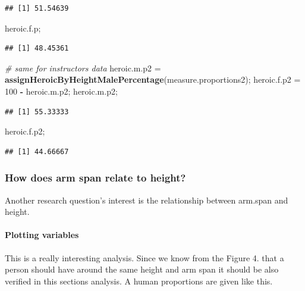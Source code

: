 \documentclass[]{article}
\newenvironment{Shaded}{\begin{snugshade}}{\end{snugshade}}
\newcommand{\CommentTok}[1]{\textcolor[rgb]{0.56,0.35,0.01}{\textit{#1}}}
\newcommand{\DecValTok}[1]{\textcolor[rgb]{0.00,0.00,0.81}{#1}}
\newcommand{\KeywordTok}[1]{\textcolor[rgb]{0.13,0.29,0.53}{\textbf{#1}}}
\newcommand{\NormalTok}[1]{#1}
\newcommand{\OperatorTok}[1]{\textcolor[rgb]{0.81,0.36,0.00}{\textbf{#1}}}
\newcommand{\StringTok}[1]{\textcolor[rgb]{0.31,0.60,0.02}{#1}}
\begin{document}
\begin{verbatim}
## [1] 51.54639
\end{verbatim}

\begin{Shaded}
\begin{Highlighting}[]
\NormalTok{heroic.f.p;}
\end{Highlighting}
\end{Shaded}

\begin{verbatim}
## [1] 48.45361
\end{verbatim}

\begin{Shaded}
\begin{Highlighting}[]
\CommentTok{\# same for instructors data}
\NormalTok{heroic.m.p2 =}\StringTok{ }\KeywordTok{assignHeroicByHeightMalePercentage}\NormalTok{(measure.proportions2);}
\NormalTok{heroic.f.p2 =}\StringTok{ }\DecValTok{100} \OperatorTok{{-}}\StringTok{ }\NormalTok{heroic.m.p2;}
\NormalTok{heroic.m.p2;}
\end{Highlighting}
\end{Shaded}

\begin{verbatim}
## [1] 55.33333
\end{verbatim}

\begin{Shaded}
\begin{Highlighting}[]
\NormalTok{heroic.f.p2;}
\end{Highlighting}
\end{Shaded}

\begin{verbatim}
## [1] 44.66667
\end{verbatim}

\newpage

\subsubsection{How does arm span relate to height?}
\label{sec:appendix-arm-span-vs-height}

Another research question's interest is the relationship between
arm.span and height.

\paragraph{Plotting variables}
\label{sec:appendix-plotting-variables}

This is a really interesting analysis. Since we know from the Figure 4.
that a person should have around the same height and arm span it should
be also verified in this sections analysis. A human proportions are
given like this.
\end{document}
